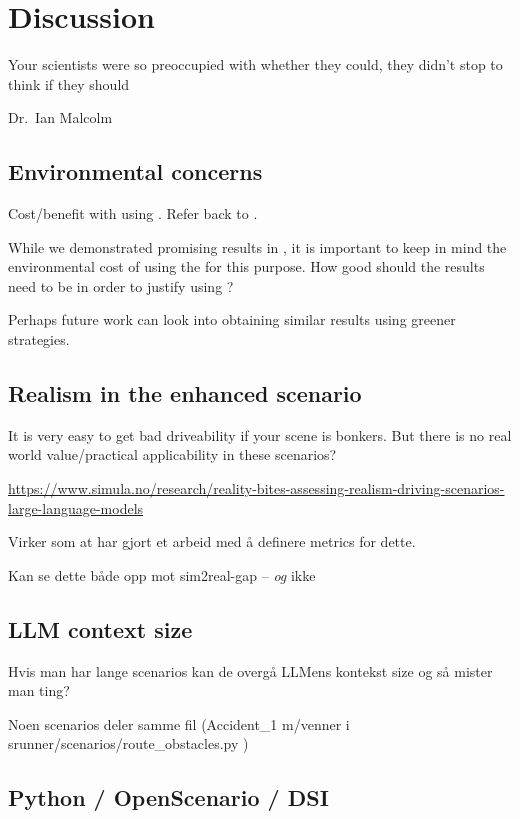 
\chapter{Discussion}

\epigraph{Your scientists were so preoccupied with whether they could, they didn't stop to think if they should}{Dr.~Ian Malcolm}


\section{Environmental concerns}
Cost/benefit with using . Refer back to .

While we demonstrated promising results in , it is important to keep in mind the
environmental cost of using the  for this purpose. How good should the results need
to be in order to justify using ?

Perhaps future work can look into obtaining similar results using greener strategies.

\section{Realism in the enhanced scenario}

It is very easy to get bad driveability if your scene is bonkers. But there is no real world
value/practical applicability in these scenarios?

\url{https://www.simula.no/research/reality-bites-assessing-realism-driving-scenarios-large-language-models}

Virker som at \cite{LLMScenarioChang24} har gjort et arbeid med å definere metrics for dette.

Kan se dette både opp mot sim2real-gap -- \emph{og} ikke


\section{LLM context size}

Hvis man har lange scenarios kan de overgå LLMens kontekst size og så mister man ting?

Noen scenarios deler samme fil (Accident\_1 m/venner i srunner/scenarios/route\_obstacles.py )

\section{Python / OpenScenario / DSI}

